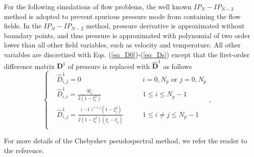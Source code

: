 \documentclass[preprint, 10pt]{elsarticle}
\begin{document}
For the following simulations of flow problems, the well known $IP_N-IP_{N-2}$ method is adopted to prevent spurious pressure mode from containing the flow fields. In the $IP_N-IP_{N-2}$ method, pressure derivative is approximated without boundary points, and thus pressure is approximated with polynomial of two order lower than all other field variables, such as velocity and temperature. All other variables are discretized with Eqs. (\ref{eq_D0})-(\ref{eq_Ds}) except that the first-order difference matrix $\mathbf{D}^{1}$ of pressure is replaced with $\hat {\mathbf{D}}^1$ as follows
\begin{equation}
\left\{ \begin{aligned}
&\hat D_{i,j}^1 = 0                              & i=0,N_p \text{  or } j=0, N_p \\
&\hat D_{i,i}^1 = \frac{3\xi_i}{2(1-\xi_i^{2})}  & 1 \le i \le N_p-1\\
&\hat D_{i,j}^1 = \frac{(-1)^{i+j}(1-\xi_j^{2})}
{2(1-\xi_i^{2})(\xi_i-\xi_j)} \qquad             & 1 \le i \ne j \le N_p-1\\
\end{aligned} \right. ,
\label{eq_D1}
\end{equation}


For more details of the Chebyshev pseudospectral method, we refer the reader to the reference.
\end{document}
